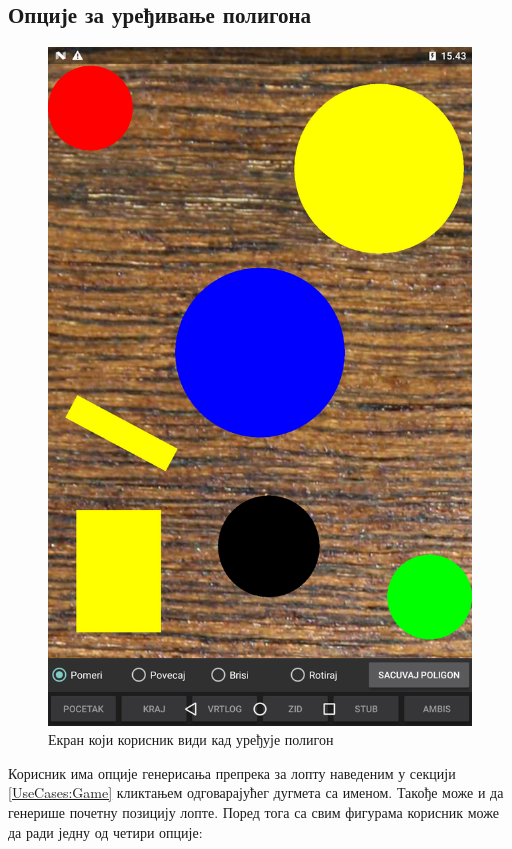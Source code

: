 \subsection{Опције за уређивање полигона}
\begin{figure}[htb!]
\begin{center}
\includegraphics[scale=.1]{pictures/createPolygon/Basic}
\caption{Екран који корисник види кад уређује полигон}\label{fig:createPolygonBasic}
\end{center}
\end{figure}
Корисник има опције генерисања препрека за лопту наведеним у секцији \ref{UseCases:Game} кликтањем одговарајућег дугмета са именом. Такође може и да генерише почетну позицију лопте.  Поред тога са свим фигурама корисник може да ради једну од четири опције:
